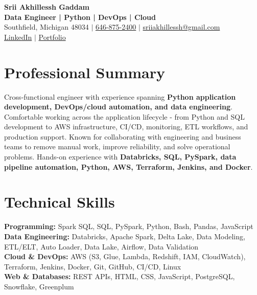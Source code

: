 \documentclass[letterpaper,10pt]{article}
\begin{document}
\fontsize{9.35pt}{10.45pt}\selectfont

\begin{center}
    {\LARGE \textbf{Srii Akhillessh Gaddam}} \\[-1pt]
    \textbf{Data Engineer | Python | DevOps | Cloud} \\[2pt]
    Southfield, Michigan 48034 $|$
    \href{tel:6468752400}{646-875-2400} $|$
    \href{mailto:sriiakhillessh@gmail.com}{sriiakhillessh@gmail.com} \\[1pt]
    \href{https://www.linkedin.com/in/srii-akhiilessh-gaddam-b48668191/}{LinkedIn} $|$
    \href{https://sriiakhillesshg.github.io/portfolio/}{Portfolio}
\end{center}
\vspace{-8pt}

\section{Professional Summary}
\small{Cross-functional engineer with experience spanning \textbf{Python application development, DevOps/cloud automation, and data engineering}. Comfortable working across the application lifecycle - from Python and SQL development to AWS infrastructure, CI/CD, monitoring, ETL workflows, and production support. Known for collaborating with engineering and business teams to remove manual work, improve reliability, and solve operational problems. Hands-on experience with \textbf{Databricks, SQL, PySpark, data pipeline automation, Python, AWS, Terraform, Jenkins, and Docker}.}

\section{Technical Skills}
\small{
\textbf{Programming:} Spark SQL, SQL, PySpark, Python, Bash, Pandas, JavaScript \\
\textbf{Data Engineering:} Databricks, Apache Spark, Delta Lake, Data Modeling, ETL/ELT, Auto Loader, Data Lake, Airflow, Data Validation \\
\textbf{Cloud \& DevOps:} AWS (S3, Glue, Lambda, Redshift, IAM, CloudWatch), Terraform, Jenkins, Docker, Git, GitHub, CI/CD, Linux \\
\textbf{Web \& Databases:} REST APIs, HTML, CSS, JavaScript, PostgreSQL, Snowflake, Greenplum
}
\end{document}
